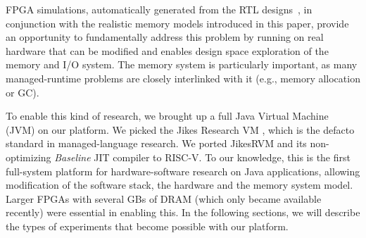 FPGA simulations, automatically generated from the RTL designs~\cite{strober}, in conjunction with the realistic memory models introduced in this paper, provide an opportunity to fundamentally address this problem by running on real hardware that can be modified and enables design space exploration of the memory and I/O system. The memory system is particularly important, as many managed-runtime problems are closely interlinked with it (e.g., memory allocation or GC).

To enable this kind of research, we brought up a full Java Virtual Machine (JVM) on our platform. We picked the Jikes Research VM \cite{alpern_jikes_2005}, which is the defacto standard in managed-language research. We ported JikesRVM and its non-optimizing \emph{Baseline} JIT compiler to RISC-V. To our knowledge, this is the first full-system platform for hardware-software research on Java applications, allowing modification of the software stack, the hardware and the memory system model. Larger FPGAs with several GBs of DRAM (which only became available recently) were essential in enabling this. In the following sections, we will describe the types of experiments that become possible with our platform.


